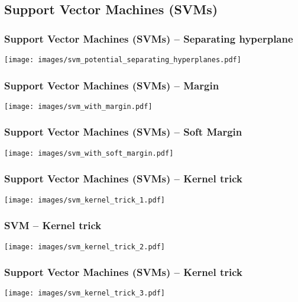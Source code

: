 \documentclass[aspectratio=169]{beamer}
\begin{document}
\subsection{Support Vector Machines (SVMs)}

\setcounter{tocdepth}{2}
\begin{frame}{}
   \tableofcontents[currentsubsection]
\end{frame}


\begin{frame}
  \frametitle{Support Vector Machines (SVMs) -- Separating hyperplane}
  \begin{center}
    \texttt{[image: images/svm\_potential\_separating\_hyperplanes.pdf]}
  \end{center}
\end{frame}

\begin{frame}
  \frametitle{Support Vector Machines (SVMs) -- Margin}
  \begin{center}
    \texttt{[image: images/svm\_with\_margin.pdf]}
  \end{center}
\end{frame}

\begin{frame}
  \frametitle{Support Vector Machines (SVMs) -- Soft Margin}
  \begin{center}
    \texttt{[image: images/svm\_with\_soft\_margin.pdf]}
  \end{center}
\end{frame}

\begin{frame}
  \frametitle{Support Vector Machines (SVMs) -- Kernel trick}
  \begin{center}
    \texttt{[image: images/svm\_kernel\_trick\_1.pdf]}
  \end{center}
\end{frame}

\begin{frame}
  \frametitle{SVM -- Kernel trick}
  \begin{center}
    \texttt{[image: images/svm\_kernel\_trick\_2.pdf]}
  \end{center}
\end{frame}

\begin{frame}
  \frametitle{Support Vector Machines (SVMs) -- Kernel trick}
  \begin{center}
    \texttt{[image: images/svm\_kernel\_trick\_3.pdf]}
  \end{center}
\end{frame}
\end{document}
